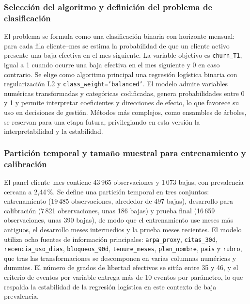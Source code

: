 \subsubsection{Selección del algoritmo y definición del problema de clasificación}

El problema se formula como una clasificación binaria con horizonte mensual: para cada fila cliente–mes se estima la probabilidad de que un cliente activo presente una baja efectiva en el mes siguiente. La variable objetivo es \texttt{churn\_\hspace{0pt}T1}, igual a 1 cuando ocurre una baja efectiva en el mes siguiente y 0 en caso contrario. Se elige como algoritmo principal una regresión logística binaria con regularización L2 y \texttt{class\_\hspace{0pt}weight='balanced'}. El modelo admite variables numéricas transformadas y categóricas codificadas, genera probabilidades entre 0 y 1 y permite interpretar coeficientes y direcciones de efecto, lo que favorece su uso en decisiones de gestión. Métodos más complejos, como ensambles de árboles, se reservan para una etapa futura, privilegiando en esta versión la interpretabilidad y la estabilidad.

\subsubsection{Partición temporal y tamaño muestral para entrenamiento y calibración}

El panel cliente–mes contiene 43\,965 observaciones y 1\,073 bajas, con prevalencia cercana a 2{,}44\,\%. Se define una partición temporal en tres conjuntos: entrenamiento (19\,485 observaciones, alrededor de 497 bajas), desarrollo para calibración (7\,821 observaciones, unas 186 bajas) y prueba final (16\,659 observaciones, unas 390 bajas), de modo que el entrenamiento use meses más antiguos, el desarrollo meses intermedios y la prueba meses recientes. El modelo utiliza ocho fuentes de información principales: \texttt{arpa\_\hspace{0pt}proxy}, \texttt{citas\_\hspace{0pt}30d}, \texttt{recencia\_\hspace{0pt}uso\_\hspace{0pt}dias}, \texttt{bloqueos\_\hspace{0pt}90d}, \texttt{tenure\_\hspace{0pt}meses}, \texttt{plan\_\hspace{0pt}nombre}, \texttt{pais} y \texttt{rubro}, que tras las transformaciones se descomponen en varias columnas numéricas y dummies. El número de grados de libertad efectivos se sitúa entre 35 y 46, y el criterio de eventos por variable entrega más de 10 eventos por parámetro, lo que respalda la estabilidad de la regresión logística en este contexto de baja prevalencia.

